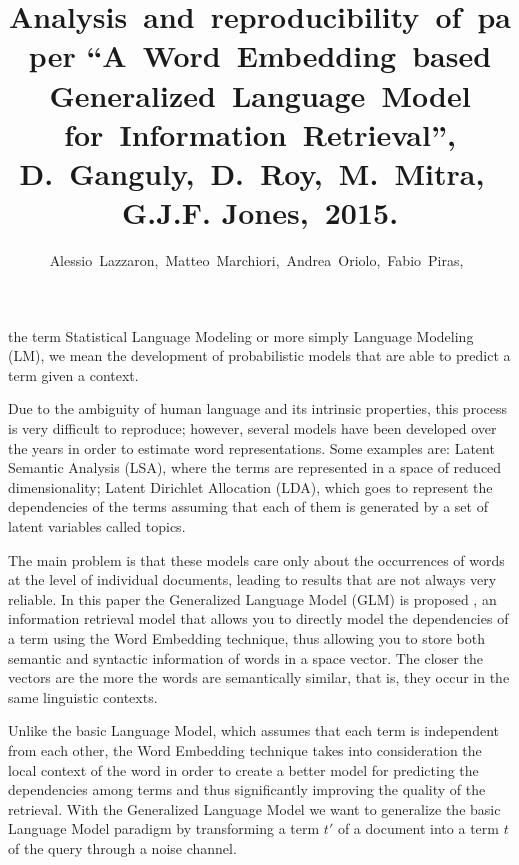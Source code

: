 \title{Analysis~and~reproducibility~of~paper ``A~Word~Embedding~based Generalized~Language~Model for~Information~Retrieval'', D.~Ganguly,~D.~Roy,~M.~Mitra,~G.J.F. Jones,~2015.}

\author{Alessio~Lazzaron,~Matteo~Marchiori,~Andrea~Oriolo,~Fabio~Piras,~}

\maketitle

 the term Statistical Language Modeling or more simply Language Modeling (LM), we mean the development of probabilistic models that are able to predict a term given a context.

Due to the ambiguity of human language and its intrinsic properties, this process is very difficult to reproduce; however, several models have been developed over the years in order to estimate word representations. Some examples are: Latent Semantic Analysis (LSA), where the terms are represented in a space of reduced dimensionality; Latent Dirichlet Allocation (LDA), which goes to represent the dependencies of the terms assuming that each of them is generated by a set of latent variables called topics.

The main problem is that these models care only about  the occurrences of words at the level of individual documents, leading to results that are not always very reliable.
In this paper the Generalized Language Model (GLM) is proposed \cite{paper:ganguly}, an information retrieval model that allows you to directly model the dependencies of a term using the Word Embedding technique, thus allowing you to store both semantic and syntactic information of words in a space vector. The closer the vectors are the more the words are semantically similar, that is, they occur in the same linguistic contexts.

Unlike the basic Language Model, which assumes that each term is independent from each other, the Word Embedding technique takes into consideration the local context of the word in order to create a better model for predicting the dependencies among terms and thus significantly improving the quality of the retrieval.
With the Generalized Language Model we want to generalize the basic Language Model paradigm by transforming a term ${t}'$ of a document into a term $t$ of the query through a noise channel.

